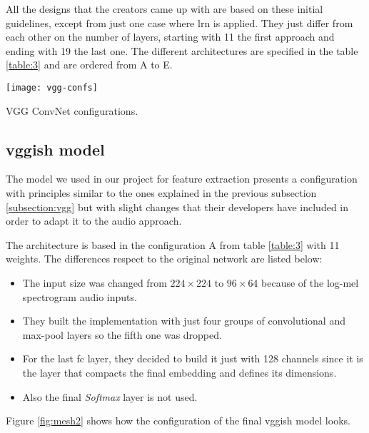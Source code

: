 	All the designs that the creators came up with are based on these initial guidelines, except from just one case where \acrfull{lrn} is applied. They just differ from each other on the number of layers, starting with 11 the first approach and ending with 19 the last one. The different architectures are specified in the table \ref{table:3} and are ordered from A to E.
	
	\begin{table}[t!]
		\begin{center}
		\captionsetup{justification=centering}
		\texttt{[image: vgg-confs]}
		\caption{VGG ConvNet configurations.}
		\label{table:3}
		\end{center}
	\end{table}

\subsection{\acrshort{vgg}ish model}
\label{subsection:vggish}
	
	The model we used in our project for feature extraction presents a configuration with principles similar to the ones explained in the previous subsection \ref{subsection:vgg} but with slight changes that their developers have included in order to adapt it to the audio approach. 
	
	The architecture is based in the configuration A from table \ref{table:3} with 11 weights. The differences respect to the original network are listed below: 
	\begin{itemize}
		\item The input size was changed from $224 \times 224$ to $96 \times 64$ because of the log-mel spectrogram audio inputs.
		\item They built the implementation with just four groups of convolutional and max-pool layers so the fifth one was dropped.
		\item For the last \acrshort{fc} layer, they decided to build it just with 128 channels since it is the layer that compacts the final embedding and defines its dimensions.
		\item Also the final \textit{Softmax} layer is not used.
	\end{itemize}
	Figure \ref{fig:mesh2} shows how the configuration of the final \acrshort{vgg}ish model looks.
	
